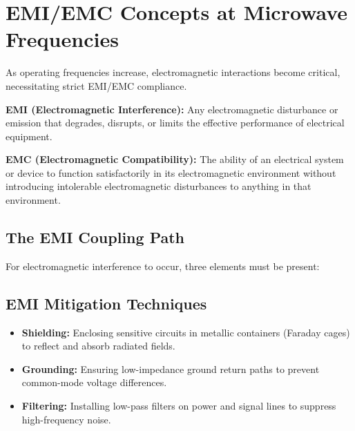 \documentclass[12pt,a4paper]{article}
\begin{document}
\section{EMI/EMC Concepts at Microwave Frequencies}

As operating frequencies increase, electromagnetic interactions become critical, necessitating strict EMI/EMC compliance.

\begin{tcolorbox}[defbox]
\textbf{EMI (Electromagnetic Interference):} Any electromagnetic disturbance or emission that degrades, disrupts, or limits the effective performance of electrical equipment.

\textbf{EMC (Electromagnetic Compatibility):} The ability of an electrical system or device to function satisfactorily in its electromagnetic environment without introducing intolerable electromagnetic disturbances to anything in that environment.
\end{tcolorbox}

\subsection{The EMI Coupling Path}
For electromagnetic interference to occur, three elements must be present:

\begin{tcolorbox}[tikzbox, title={Elements of Electromagnetic Interference}]
\centering
{}
\end{tcolorbox}

\subsection{EMI Mitigation Techniques}
\begin{itemize}[leftmargin=*, itemsep=2pt]
  \item \textbf{Shielding:} Enclosing sensitive circuits in metallic containers (Faraday cages) to reflect and absorb radiated fields.
  \item \textbf{Grounding:} Ensuring low-impedance ground return paths to prevent common-mode voltage differences.
  \item \textbf{Filtering:} Installing low-pass filters on power and signal lines to suppress high-frequency noise.
\end{itemize}
\end{document}
